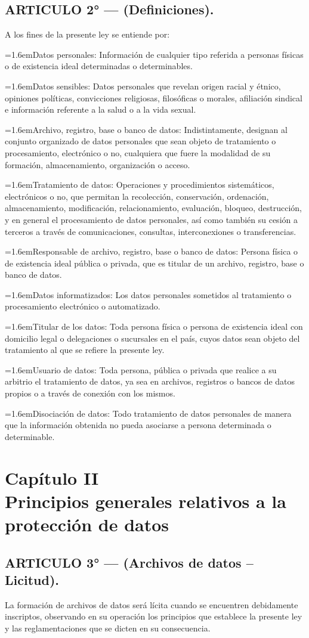 \documentclass[10pt,a4paper]{article}
\newcommand{\capitulo}[2]{\section[#1 --- #2]{#1\\[2pt]#2}}
\newcommand{\articulo}[1]{\subsection{#1}}
\newcommand{\inciso}[2]{\par{\hangindent=1.6em\hangafter=1\makebox[1.6em][l]{#1}#2\par}}
\begin{document}
\articulo{ARTICULO 2° — (Definiciones).}
A los fines de la presente ley se entiende por:

\inciso{—}{Datos personales: Información de cualquier tipo referida a personas físicas o de existencia ideal determinadas o determinables.}

\inciso{—}{Datos sensibles: Datos personales que revelan origen racial y étnico, opiniones políticas, convicciones religiosas, filosóficas o morales, afiliación sindical e información referente a la salud o a la vida sexual.}

\inciso{—}{Archivo, registro, base o banco de datos: Indistintamente, designan al conjunto organizado de datos personales que sean objeto de tratamiento o procesamiento, electrónico o no, cualquiera que fuere la modalidad de su formación, almacenamiento, organización o acceso.}

\inciso{—}{Tratamiento de datos: Operaciones y procedimientos sistemáticos, electrónicos o no, que permitan la recolección, conservación, ordenación, almacenamiento, modificación, relacionamiento, evaluación, bloqueo, destrucción, y en general el procesamiento de datos personales, así como también su cesión a terceros a través de comunicaciones, consultas, interconexiones o transferencias.}

\inciso{—}{Responsable de archivo, registro, base o banco de datos: Persona física o de existencia ideal pública o privada, que es titular de un archivo, registro, base o banco de datos.}

\inciso{—}{Datos informatizados: Los datos personales sometidos al tratamiento o procesamiento electrónico o automatizado.}

\inciso{—}{Titular de los datos: Toda persona física o persona de existencia ideal con domicilio legal o delegaciones o sucursales en el país, cuyos datos sean objeto del tratamiento al que se refiere la presente ley.}

\inciso{—}{Usuario de datos: Toda persona, pública o privada que realice a su arbitrio el tratamiento de datos, ya sea en archivos, registros o bancos de datos propios o a través de conexión con los mismos.}

\inciso{—}{Disociación de datos: Todo tratamiento de datos personales de manera que la información obtenida no pueda asociarse a persona determinada o determinable.}

\capitulo{Capítulo II}{Principios generales relativos a la protección de datos}
\articulo{ARTICULO 3° — (Archivos de datos – Licitud).}
La formación de archivos de datos será lícita cuando se encuentren debidamente inscriptos, observando en su operación los principios que establece la presente ley y las reglamentaciones que se dicten en su consecuencia.
\end{document}
